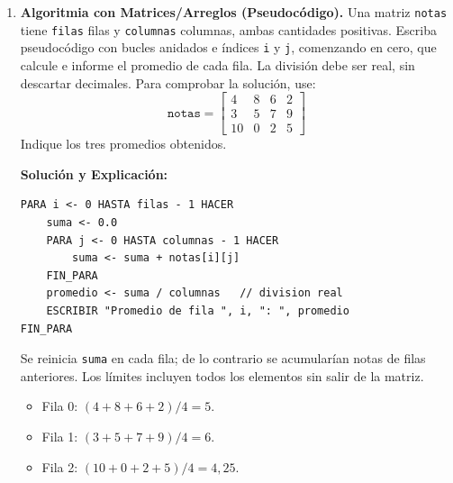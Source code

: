 \documentclass[11pt,letterpaper]{article}
\begin{document}
\begin{enumerate}[label=\textbf{\arabic*.}]
    \newpage
    \item \textbf{Algoritmia con Matrices/Arreglos (Pseudocódigo).}
    Una matriz \texttt{notas} tiene \texttt{filas} filas y \texttt{columnas} columnas, ambas cantidades positivas. Escriba pseudocódigo con bucles anidados e índices \texttt{i} y \texttt{j}, comenzando en cero, que calcule e informe el promedio de cada fila. La división debe ser real, sin descartar decimales. Para comprobar la solución, use:
    \[
    \texttt{notas} =
    \begin{bmatrix}
    4 & 8 & 6 & 2 \\
    3 & 5 & 7 & 9 \\
    10 & 0 & 2 & 5
    \end{bmatrix}
    \]
    Indique los tres promedios obtenidos.
    \begin{solucionbox}
    \textbf{Solución y Explicación:}
    \begin{lstlisting}[style=pseudocodigo]
PARA i <- 0 HASTA filas - 1 HACER
    suma <- 0.0
    PARA j <- 0 HASTA columnas - 1 HACER
        suma <- suma + notas[i][j]
    FIN_PARA
    promedio <- suma / columnas   // division real
    ESCRIBIR "Promedio de fila ", i, ": ", promedio
FIN_PARA
    \end{lstlisting}
    Se reinicia \texttt{suma} en cada fila; de lo contrario se acumularían notas de filas anteriores. Los límites incluyen todos los elementos sin salir de la matriz.
    \begin{itemize}[noitemsep]
        \item Fila 0: $(4+8+6+2)/4=5$.
        \item Fila 1: $(3+5+7+9)/4=6$.
        \item Fila 2: $(10+0+2+5)/4=4{,}25$.
    \end{itemize}
    \end{solucionbox}
\end{enumerate}
\end{document}
